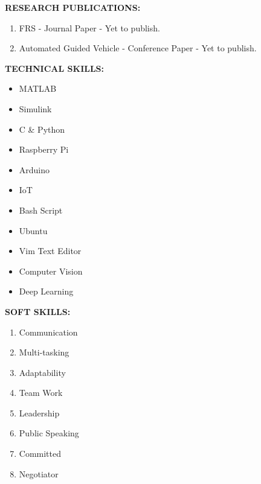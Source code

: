 \documentclass[a4paper, 10pt]{article}
\begin{document}
{\textbf{\Large{RESEARCH PUBLICATIONS:}}}
\begin{enumerate}
\item FRS - Journal Paper - Yet to publish.
\item Automated Guided Vehicle - Conference Paper - Yet to publish. \\
\end{enumerate}

{\textbf{\Large{TECHNICAL SKILLS:}}}
\begin{itemize}
\item MATLAB
\item Simulink
\item C \& Python
\item Raspberry Pi
\item Arduino
\item IoT
\item Bash Script
\item Ubuntu
\item Vim Text Editor
\item Computer Vision
\item Deep Learning \\
\end{itemize}

{\textbf{\Large{SOFT SKILLS:}}}
\begin{enumerate}
\item Communication
\item Multi-tasking
\item Adaptability
\item Team Work
\item Leadership
\item Public Speaking
\item Committed
\item Negotiator \\
\end{enumerate}
\end{document}
